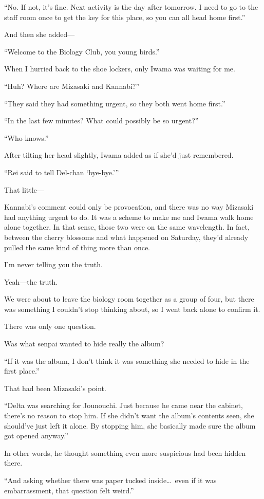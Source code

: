 \documentclass[
    a4paper,
    12pt,
    twoside,
    openany,
    UTF8,
    fontset=windows
]{ctexbook}
\begin{document}
``No. If not, it's fine. Next activity is the day after tomorrow. I need to go to the staff room once to get the key for this place, so you can all head home first.''

And then she added---

``Welcome to the Biology Club, you young birds.''

When I hurried back to the shoe lockers, only Iwama was waiting for me.

``Huh? Where are Mizasaki and Kannabi?''

``They said they had something urgent, so they both went home first.''

``In the last few minutes? What could possibly be so urgent?''

``Who knows.''

After tilting her head slightly, Iwama added as if she'd just remembered.

``Rei said to tell Del-chan `bye-bye.'''

That little---

Kannabi's comment could only be provocation, and there was no way Mizasaki had anything urgent to do. It was a scheme to make me and Iwama walk home alone together. In that sense, those two were on the same wavelength. In fact, between the cherry blossoms and what happened on Saturday, they'd already pulled the same kind of thing more than once.

I'm never telling you the truth.

Yeah---the truth.

We were about to leave the biology room together as a group of four, but there was something I couldn't stop thinking about, so I went back alone to confirm it.

There was only one question.

Was what senpai wanted to hide really the album?

``If it was the album, I don't think it was something she needed to hide in the first place.''

That had been Mizasaki's point.

``Delta was searching for Jounouchi. Just because he came near the cabinet, there's no reason to stop him. If she didn't want the album's contents seen, she should've just left it alone. By stopping him, she basically made sure the album got opened anyway.''

In other words, he thought something even more suspicious had been hidden there.

``And asking whether there was paper tucked inside\dots\ even if it was embarrassment, that question felt weird.''
\end{document}
